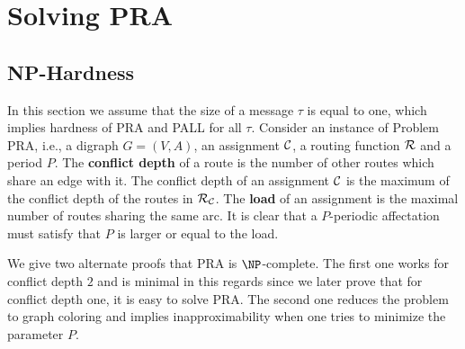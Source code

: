 \documentclass[a4paper,10pt]{article}
\begin{document}
	

  
\section{Solving PRA}
  \label{sec:complexity}
  \subsection{NP-Hardness}

 In this section we assume that the size of a message $\tau$ is equal to one, which implies hardness of PRA and PALL for all $\tau$. 
Consider an instance of Problem PRA, i.e., a digraph $G=(V,A)$, an assignment $\cal C$, a routing function $\cal R$ and a period $P$. 
The {\bf conflict depth} of a route is the number of other routes which share an edge with it. 
The conflict depth of an assignment $\cal C$ is the maximum of the conflict depth of the routes in ${\cal R}_{\cal C}$.
The {\bf load} of an assignment is the maximal number of routes sharing the same arc.
It is clear that a $P$-periodic affectation must satisfy that $P$ is larger or equal to the load.

We give two alternate proofs that PRA is $\NP$-complete.
The first one works for conflict depth $2$ and is minimal in this regards since we later prove that for conflict depth one,
it is easy to solve PRA. The second one reduces the problem to graph coloring and implies inapproximability when one tries to minimize the parameter $P$. \\
 

 
\end{document}
